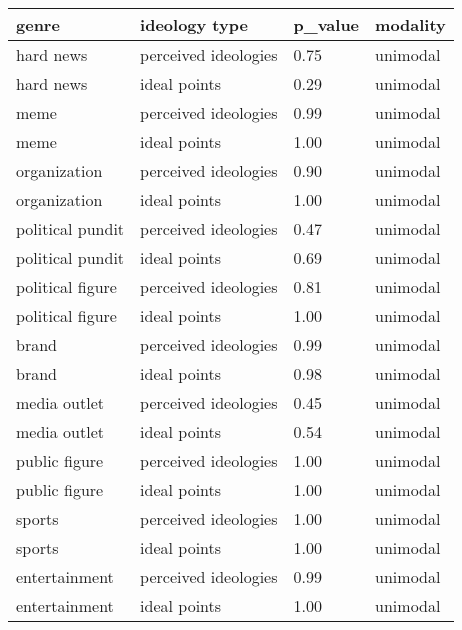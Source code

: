 \begin{table}
\centering
\begin{tabular}[t]{llll}
\toprule
genre & ideology type & p\_value & modality\\
\midrule
hard news & perceived ideologies & 0.75 & unimodal\\
hard news & ideal points & 0.29 & unimodal\\
meme & perceived ideologies & 0.99 & unimodal\\
meme & ideal points & 1.00 & unimodal\\
organization & perceived ideologies & 0.90 & unimodal\\
organization & ideal points & 1.00 & unimodal\\
political pundit & perceived ideologies & 0.47 & unimodal\\
political pundit & ideal points & 0.69 & unimodal\\
political figure & perceived ideologies & 0.81 & unimodal\\
political figure & ideal points & 1.00 & unimodal\\
brand & perceived ideologies & 0.99 & unimodal\\
brand & ideal points & 0.98 & unimodal\\
media outlet & perceived ideologies & 0.45 & unimodal\\
media outlet & ideal points & 0.54 & unimodal\\
public figure & perceived ideologies & 1.00 & unimodal\\
public figure & ideal points & 1.00 & unimodal\\
sports & perceived ideologies & 1.00 & unimodal\\
sports & ideal points & 1.00 & unimodal\\
entertainment & perceived ideologies & 0.99 & unimodal\\
entertainment & ideal points & 1.00 & unimodal\\
\bottomrule
\end{tabular}
\end{table}

